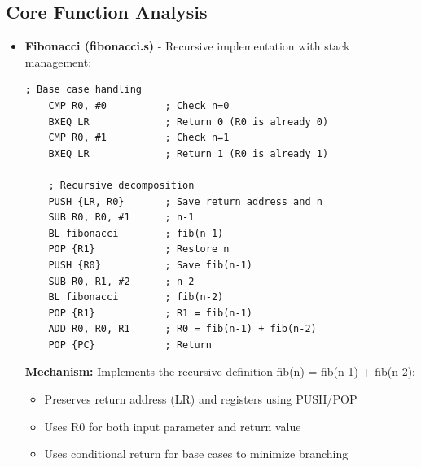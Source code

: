\documentclass[a4paper,12pt]{article}
\newenvironment{sectionbox}[1]{%
    \tcolorbox[
        colback=titleblue!5,
        colframe=titleblue!50,
        arc=3mm,
        title=#1,
        fonttitle=\bfseries\sffamily,
        before skip=1.2em,
        after skip=1.2em
    ]
}{\endtcolorbox}
\begin{document}
\begin{sectionbox}{Technical Implementation (continued)}
\subsection*{Core Function Analysis}

\begin{itemize}[leftmargin=2em]


    \item \textbf{Fibonacci (fibonacci.s)} - Recursive implementation with stack management:
    \begin{lstlisting}[language={[x86masm]Assembler}]
    ; Base case handling
    CMP R0, #0          ; Check n=0
    BXEQ LR             ; Return 0 (R0 is already 0)
    CMP R0, #1          ; Check n=1
    BXEQ LR             ; Return 1 (R0 is already 1)
    
    ; Recursive decomposition
    PUSH {LR, R0}       ; Save return address and n
    SUB R0, R0, #1      ; n-1
    BL fibonacci        ; fib(n-1)
    POP {R1}            ; Restore n
    PUSH {R0}           ; Save fib(n-1)
    SUB R0, R1, #2      ; n-2
    BL fibonacci        ; fib(n-2)
    POP {R1}            ; R1 = fib(n-1)
    ADD R0, R0, R1      ; R0 = fib(n-1) + fib(n-2)
    POP {PC}            ; Return
    \end{lstlisting}

    \textbf{Mechanism:} Implements the recursive definition fib(n) = fib(n-1) + fib(n-2):
    \begin{itemize}
        \item Preserves return address (LR) and registers using PUSH/POP
        \item Uses R0 for both input parameter and return value
        \item Uses conditional return for base cases to minimize branching
    \end{itemize}
\end{itemize}
\end{sectionbox}
\end{document}
